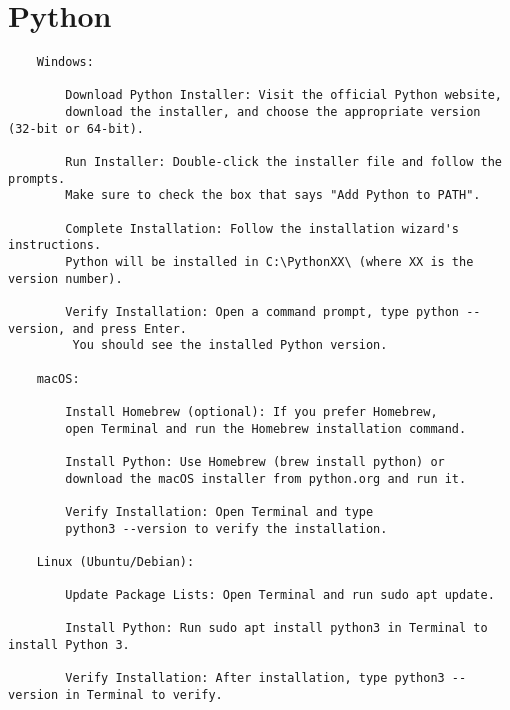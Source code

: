 \documentclass{report}
\begin{document}
\pagebreak

\setcounter{chapter}{1}
\setcounter{section}{0}
\section{Python}


\sol{}

\begin{verbatim}
	Windows:

		Download Python Installer: Visit the official Python website, 
		download the installer, and choose the appropriate version (32-bit or 64-bit).

		Run Installer: Double-click the installer file and follow the prompts. 
		Make sure to check the box that says "Add Python to PATH".

		Complete Installation: Follow the installation wizard's instructions. 
		Python will be installed in C:\PythonXX\ (where XX is the version number).

		Verify Installation: Open a command prompt, type python --version, and press Enter.
		 You should see the installed Python version.

	macOS:

		Install Homebrew (optional): If you prefer Homebrew, 
		open Terminal and run the Homebrew installation command.

		Install Python: Use Homebrew (brew install python) or 
		download the macOS installer from python.org and run it.

		Verify Installation: Open Terminal and type 
		python3 --version to verify the installation.

	Linux (Ubuntu/Debian):

		Update Package Lists: Open Terminal and run sudo apt update.

		Install Python: Run sudo apt install python3 in Terminal to install Python 3.

		Verify Installation: After installation, type python3 --version in Terminal to verify.

\end{verbatim}

\newpage


\sol{}
\end{document}
